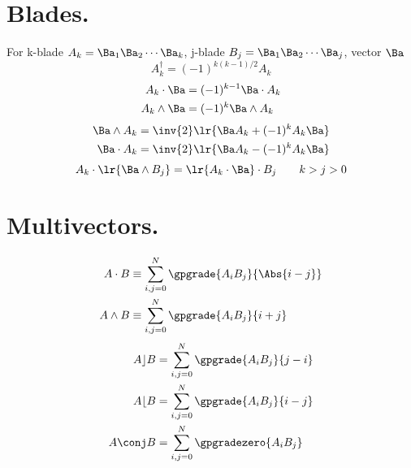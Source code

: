 \section{Blades.}
For k-blade \( A_k = \Ba_1 \Ba_2 \cdots \Ba_k \), j-blade \( B_j = \Ba_1 \Ba_2 \cdots \Ba_j \), vector \( \Ba \)
\begin{equation}\label{eqn:helpful:240}
A_k^\dagger = (-1)^{k(k-1)/2} A_k
\end{equation}
\begin{equation}\label{eqn:helpful:260}
\begin{aligned}
A_k \cdot \Ba  &= (-1)^{k-1} \Ba \cdot A_k \\
A_k \wedge \Ba &= (-1)^k \Ba \wedge A_k
\end{aligned}
\end{equation}
\begin{equation}\label{eqn:helpful:280}
\begin{aligned}
\Ba \wedge A_k &= \inv{2}\lr{ \Ba A_k + (-1)^k A_k \Ba } \\
\Ba \cdot A_k &= \inv{2}\lr{ \Ba A_k - (-1)^k A_k \Ba }
\end{aligned}
\end{equation}
\begin{equation*}
A_k \cdot \lr{ \Ba \wedge B_j } = \lr{ A_k \cdot \Ba } \cdot B_j\qquad k > j > 0
\end{equation*}

\section{Multivectors.}
\begin{equation}\label{eqn:helpful:300}
\begin{aligned}
A \cdot B &\equiv \sum_{i,j = 0}^N \gpgrade{ A_i B_j }{\Abs{i - j}} \\
A \wedge B &\equiv \sum_{i,j = 0}^N \gpgrade{ A_i B_j }{i + j}
\end{aligned}
\end{equation}
\begin{equation}\label{eqn:helpful:320}
\begin{aligned}
A \rfloor B &= \sum_{i,j = 0}^N \gpgrade{ A_i B_j }{j - i} \\
A \lfloor B &= \sum_{i,j = 0}^N \gpgrade{ A_i B_j }{i - j} \\
A \conj B &= \sum_{i,j = 0}^N \gpgradezero{ A_i B_j }
\end{aligned}
\end{equation}
